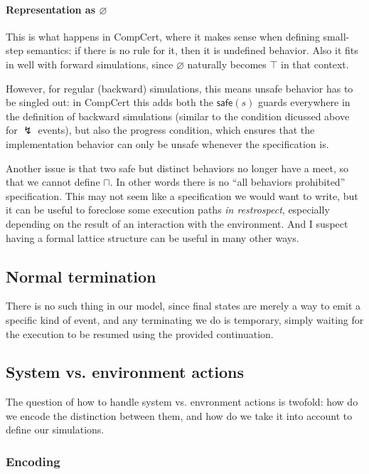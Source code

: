 \documentclass[11pt]{article}
\begin{document}
\paragraph{Representation as $\varnothing$}

This is what happens in CompCert,
where it makes sense when defining small-step semantics:
if there is no rule for it,
then it is undefined behavior.
Also it fits in well with forward simulations,
since $\varnothing$ naturally becomes $\top$ in that context.

However, for regular (backward) simulations,
this means unsafe behavior has to be singled out:
in CompCert this adds both the $\mathsf{safe}(s)$
guards everywhere in the definition of backward simulations
(similar to the condition dicussed above for $\lightning$ events),
but also the progress condition,
which ensures that the implementation behavior
can only be unsafe whenever the specification is.

Another issue is that
two safe but distinct behaviors no longer have a meet,
so that we cannot define $\sqcap$.
In other words there is no ``all behaviors prohibited'' specification.
This may not seem like a specification we would want to write,
but it can be useful to foreclose some execution paths \emph{in restrospect},
especially depending on the result of an interaction with the environment.
And I suspect having a formal lattice structure
can be useful in many other ways.


\subsection{Normal termination} %

There is no such thing in our model,
since final states are merely a way to emit
a specific kind of event,
and any terminating we do is temporary,
simply waiting for the execution to be resumed
using the provided continuation.


\subsection{System vs. environment actions} %

The question of how to handle system vs. envronment actions is twofold:
how do we encode the distinction between them, and
how do we take it into account to define our simulations.

\subsubsection{Encoding} %
\end{document}
